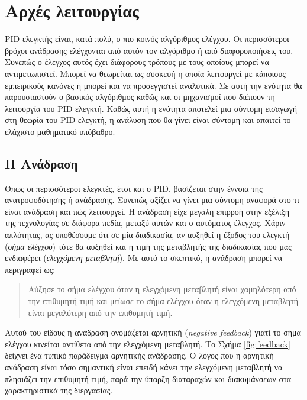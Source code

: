 \section{Αρχές λειτουργίας}

\lettrine[findent=2pt]{}{} PID ελεγκτής είναι, κατά πολύ, ο πιο κοινός αλγόριθμος ελέγχου. Οι περισσότεροι βρόχοι ανάδρασης ελέγχονται από αυτόν τον αλγόριθμο ή από διαφοροποιήσεις του. Συνεπώς ο έλεγχος αυτός έχει διάφορους τρόπους με τους οποίους μπορεί να αντιμετωπιστεί. Μπορεί να θεωρείται ως συσκευή η οποία λειτουργεί με κάποιους εμπειρικούς κανόνες ή μπορεί και να προσεγγιστεί αναλυτικά. Σε αυτή την ενότητα θα παρουσιαστούν ο βασικός αλγόριθμος καθώς και οι μηχανισμοί που διέπουν τη λειτουργία του PID ελεγκτή. Καθώς αυτή η ενότητα αποτελεί μια σύντομη εισαγωγή στη θεωρία του PID ελεγκτή, η ανάλυση που θα γίνει είναι σύντομη και απαιτεί το ελάχιστο μαθηματικό υπόβαθρο. 

\subsection{H Ανάδραση}

Όπως οι περισσότεροι ελεγκτές, έτσι και ο PID, βασίζεται στην έννοια της ανατροφοδότησης ή ανάδρασης. Συνεπώς αξίζει να γίνει μια σύντομη αναφορά στο τι είναι ανάδραση και πώς λειτουργεί. Η ανάδραση είχε μεγάλη επιρροή στην εξέλιξη της τεχνολογίας σε διάφορα πεδία, μεταξύ αυτών και ο αυτόματος έλεγχος. Χάριν απλότητας, ας υποθέσουμε ότι σε μία διαδικασία, αν αυξηθεί η έξοδος του ελεγκτή (\emph{σήμα ελέγχου}) τότε θα αυξηθεί και η τιμή της μεταβλητής της διαδικασίας που μας ενδιαφέρει (\emph{ελεγχόμενη μεταβλητή}). Με αυτό το σκεπτικό, η ανάδραση μπορεί να περιγραφεί ως:
\begin{quote}
Αύξησε το σήμα ελέγχου όταν η ελεγχόμενη μεταβλητή είναι χαμηλότερη από την επιθυμητή τιμή και μείωσε το σήμα ελέγχου όταν η ελεγχόμενη μεταβλητή είναι μεγαλύτερη από την επιθυμητή τιμή.
\end{quote}
Αυτού του είδους η ανάδραση ονομάζεται αρνητική (\emph{negative feedback}) γιατί το σήμα ελέγχου κινείται αντίθετα από την ελεγχόμενη μεταβλητή. Το Σχήμα \ref{fig:feedback} δείχνει ένα τυπικό παράδειγμα αρνητικής ανάδρασης. Ο λόγος που η αρνητική ανάδραση είναι τόσο σημαντική είναι επειδή κάνει την ελεγχόμενη μεταβλητή να πλησιάζει την επιθυμητή τιμή, παρά την ύπαρξη διαταραχών και διακυμάνσεων στα χαρακτηριστικά της διεργασίας.

